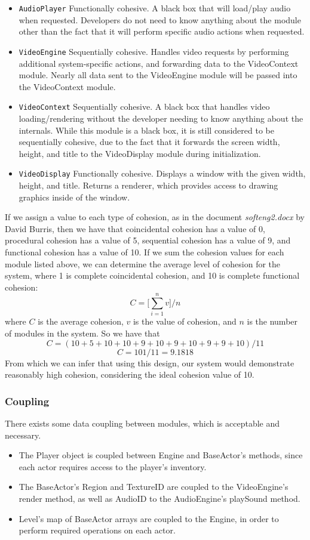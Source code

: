 \documentclass{article}
\begin{document}
\begin{itemize}
        \item \texttt{AudioPlayer} Functionally cohesive. A black box that will load/play audio when requested. Developers do not need to know anything about the module other than the fact that it will perform specific audio actions when requested.
        \item \texttt{VideoEngine} Sequentially cohesive. Handles video requests by performing additional system-specific actions, and forwarding data to the VideoContext module. Nearly all data sent to the VideoEngine module will be passed into the VideoContext module.
        \item \texttt{VideoContext} Sequentially cohesive. A black box that handles video loading/rendering without the developer needing to know anything about the internals. While this module is a black box, it is still considered to be sequentially cohesive, due to the fact that it forwards the screen width, height, and title to the VideoDisplay module during initialization.
        \item \texttt{VideoDisplay} Functionally cohesive. Displays a window with the given width, height, and title. Returns a renderer, which provides access to drawing graphics inside of the window.
			\end{itemize}
			If we assign a value to each type of cohesion, as in the document \emph{softeng2.docx} by David Burris, then we have that coincidental cohesion has a value of 0, procedural cohesion has a value of 5, sequential cohesion has a value of 9, and functional cohesion has a value of 10. If we sum the cohesion values for each module listed above, we can determine the average level of cohesion for the system, where 1 is complete coincidental cohesion, and 10 is complete functional cohesion:
			$$C = \Bigg[\sum_{i=1}^{n}v\Bigg] /n$$
			where $C$ is the average cohesion, $v$ is the value of cohesion, and $n$ is the number of modules in the system. So we have that
			$$C = (10 + 5 + 10 + 10 + 9 + 10 + 9 + 10 + 9 + 9 + 10)/11$$
			$$C = 101/11 = 9.1818$$
			From which we can infer that using this design, our system would demonstrate reasonably high cohesion, considering the ideal cohesion value of 10.
			
		\subsubsection{Coupling}
			There exists some data coupling between modules, which is acceptable and necessary.
			\begin{itemize}
				\item The Player object is coupled between Engine and BaseActor's methods, since each actor requires access to the player's inventory. 
				\item The BaseActor's Region and TextureID are coupled to the VideoEngine's render method, as well as AudioID to the AudioEngine's playSound method.
				\item Level's map of BaseActor arrays are coupled to the Engine, in order to perform required operations on each actor.
			\end{itemize}
\end{document}
